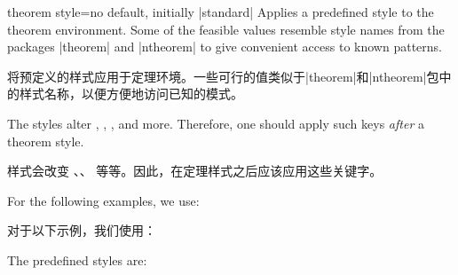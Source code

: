 \begin{docTcbKey}{theorem style}{=}{no default, initially |standard|}
Applies a predefined style  to the theorem environment. Some of
the feasible  values resemble style names from the packages |theorem|
and |ntheorem| to give convenient access to known patterns.

将预定义的样式应用于定理环境。一些可行的值类似于|theorem|和|ntheorem|包中的样式名称，以便方便地访问已知的模式。
\begin{marker}
The styles alter , ,
, and more. Therefore, one should apply such
keys \emph{after} a theorem style.

样式会改变 、、 等等。因此，在定理样式之后应该应用这些关键字。
\end{marker}

For the following examples, we use:

对于以下示例，我们使用：



The predefined styles are:


\end{docTcbKey}
